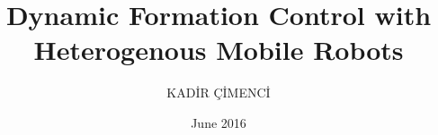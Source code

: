 \documentclass[chaparabic,ee,ms,12pt,oneandhalf]{metu}
\author{KADİR ÇİMENCİ}
\title{Dynamic Formation Control with Heterogenous Mobile Robots}
\date{June 2016}
\begin{document}
\begin{preliminaries}

%
\end{preliminaries}
%   
% 
%







  





%


 
%

\end{document}
